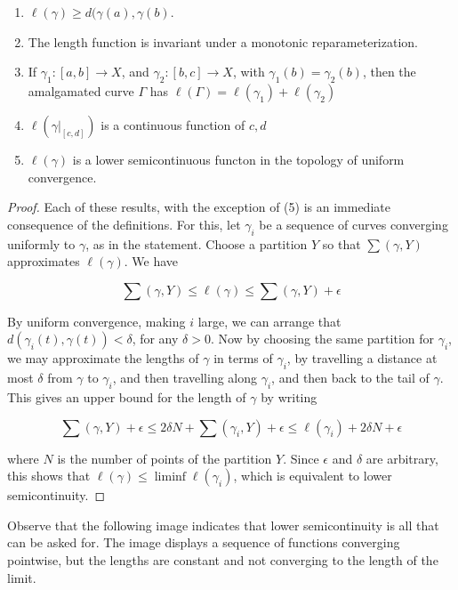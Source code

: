 \documentclass[12pt]{amsart}
\begin{document}
\begin{enumerate}
    \item $\ell(\gamma) \geq d(\gamma(a), \gamma(b)$. 
    \item The length function is invariant under a monotonic reparameterization. 
    \item If $\gamma_1:[a,b] \to X$, and $\gamma_2:[b,c] \to X$, with $\gamma_1(b) = \gamma_2(b)$, then the amalgamated curve $\Gamma$ has $\ell(\Gamma) = \ell(\gamma_1) + \ell(\gamma_2)$
    \item $\ell(\gamma|_{[c,d]})$ is a continuous function of $c,d$
    \item $\ell(\gamma)$ is a lower semicontinuous functon in the topology of uniform convergence.
\end{enumerate}

\begin{proof}

Each of these results, with the exception of (5) is an immediate consequence of the definitions.  For this, let $\gamma_i$ be a sequence of curves converging uniformly to $\gamma$, as in the statement. Choose a partition $Y$ so that $\sum(\gamma, Y)$ approximates $\ell(\gamma)$. We have 

$$\sum(\gamma, Y) \leq \ell(\gamma) \leq \sum(\gamma, Y) + \epsilon $$

By uniform convergence, making $i$ large, we can arrange that $d(\gamma_i(t), \gamma(t)) < \delta$, for any $\delta > 0$. Now by choosing the same partition for $\gamma_i$, we may approximate the lengths of $\gamma$ in terms of $\gamma_i$, by travelling a distance at most $\delta$ from $\gamma$ to $\gamma_i$, and then travelling along $\gamma_i$, and then back to the tail of $\gamma$. This gives an upper bound for the length of $\gamma$ by writing 

$$\sum(\gamma, Y) + \epsilon \leq 2 \delta N + \sum(\gamma_i, Y) + \epsilon \leq \ell(\gamma_i) + 2 \delta N  + \epsilon$$

where $N$ is the number of points of the partition $Y$. Since $\epsilon$ and $\delta$ are arbitrary, this shows that $\ell(\gamma) \leq \liminf \ell(\gamma_i)$, which is equivalent to lower semicontinuity.

\end{proof}

Observe that the following image indicates that lower semicontinuity is all that can be asked for. The image displays a sequence of functions converging pointwise, but the lengths are constant and not converging to the length of the limit.
\end{document}
